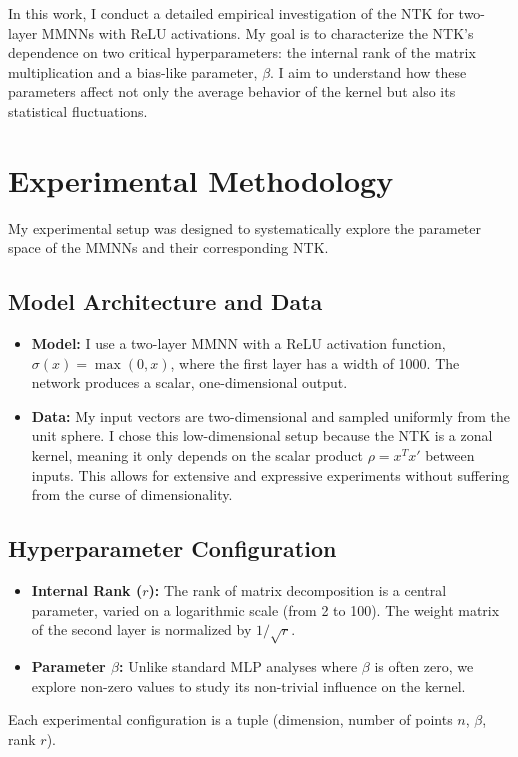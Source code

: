 \documentclass[a4paper]{article}
\begin{document}
In this work, I conduct a detailed empirical investigation of the NTK for two-layer MMNNs with ReLU activations. My goal is to characterize the NTK's dependence on two critical hyperparameters: the internal rank of the matrix multiplication and a bias-like parameter, $\beta$. I aim to understand how these parameters affect not only the average behavior of the kernel but also its statistical fluctuations.

\section{Experimental Methodology}
My experimental setup was designed to systematically explore the parameter space of the MMNNs and their corresponding NTK.

\subsection{Model Architecture and Data}
\begin{itemize}
    \item \textbf{Model:} I use a two-layer MMNN with a ReLU activation function, $\sigma(x) = \max(0, x)$, where the first layer has a width of 1000. The network produces a scalar, one-dimensional output.
    \item \textbf{Data:} My input vectors are two-dimensional and sampled uniformly from the unit sphere. I chose this low-dimensional setup because the NTK is a zonal kernel, meaning it only depends on the scalar product $\rho = x^T x'$ between inputs. This allows for extensive and expressive experiments without suffering from the curse of dimensionality.
\end{itemize}

\subsection{Hyperparameter Configuration}
\begin{itemize}
    \item \textbf{Internal Rank ($r$):} The rank of matrix decomposition is a central parameter, varied on a logarithmic scale (from 2 to 100). The weight matrix of the second layer is normalized by $1/\sqrt{r}$.
    \item \textbf{Parameter $\beta$:} Unlike standard MLP analyses where $\beta$ is often zero, we explore non-zero values to study its non-trivial influence on the kernel.
\end{itemize}
Each experimental configuration is a tuple (dimension, number of points $n$, $\beta$, rank $r$).
\end{document}
